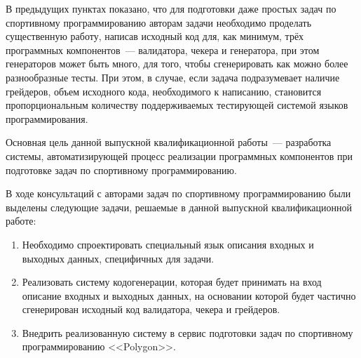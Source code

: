\documentclass[times,specification,annotation]{style/itmo-student-thesis/itmo-student-thesis}
\begin{document}
В предыдущих пунктах показано, что для подготовки даже простых задач по спортивному программированию авторам задачи необходимо проделать существенную работу, написав исходный код для, как минимум, трёх программных компонентов~--- валидатора, чекера и генератора, при этом генераторов может быть много, для того, чтобы сгенерировать как можно более разнообразные тесты. При этом, в случае, если задача подразумевает наличие грейдеров, объем исходного кода, необходимого к написанию, становится пропорциональным количеству поддерживаемых тестирующей системой языков программирования.


Основная цель данной выпускной квалификационной работы~--- разработка системы, автоматизирующей процесс реализации программных компонентов при подготовке задач по спортивному программированию.

В ходе консультаций с авторами задач по спортивному программированию были выделены следующие задачи, решаемые в данной выпускной квалификационной работе:

\begin{enumerate}
    \item Необходимо спроектировать специальный язык описания входных и выходных данных, специфичных для задачи.
    \item Реализовать систему кодогенерации, которая будет принимать на вход описание входных и выходных данных, на основании которой будет частично сгенерирован исходный код валидатора, чекера и грейдеров.
    \item Внедрить реализованную систему в сервис подготовки задач по спортивному программированию <<Polygon>>.
\end{enumerate}




\end{document}
